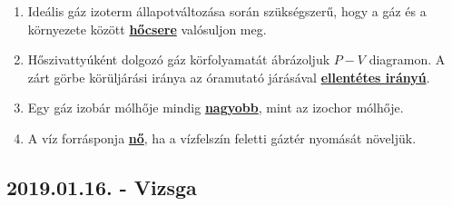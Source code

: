 \documentclass[../../fizika_kerdesek.tex]{subfiles}
\begin{document}
{\begin{enumerate}
                \item Ideális gáz izoterm állapotváltozása során szükségszerű, hogy a gáz és a környezete között \underline{\textbf{hőcsere}} valósuljon meg.
                \item Hőszivattyúként dolgozó gáz körfolyamatát ábrázoljuk $P-V$ diagramon. A zárt görbe körüljárási iránya az óramutató járásával \underline{\textbf{ellentétes irányú}}.
                \item Egy gáz izobár mólhője mindig \underline{\textbf{nagyobb}}, mint az izochor mólhője. 
                \item A víz forrásponja \underline{\textbf{nő}}, ha a vízfelszín feletti gáztér nyomását növeljük.
            \end{enumerate}}

    \subsection{2019.01.16. - Vizsga}
\end{document}

